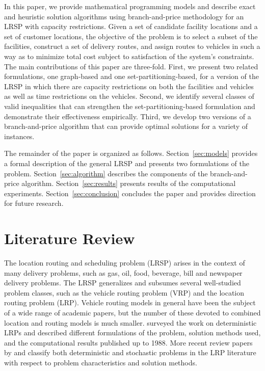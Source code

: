 \documentclass[11pt]{article}
\begin{document}
In this paper, we provide mathematical programming models and describe 
exact and heuristic solution algorithms using branch-and-price methodology for an LRSP with 
capacity restrictions. Given a set of candidate facility locations and a set of customer locations, 
the objective of the problem is to select a subset of the facilities, 
construct a set of delivery routes, and assign routes to vehicles 
in such a way as to minimize total cost subject to satisfaction of the system's constraints.   
The main contributions of this paper are three-fold.  First, we present
two related formulations, one graph-based and one set-partitioning-based, for a version of the LRSP
in which there are capacity restrictions on both the facilities and vehicles as well as time restrictions
on the vehicles.  Second, we identify several classes of valid inequalities that can
strengthen the set-partitioning-based formulation and demonstrate their effectiveness empirically.
Third, we develop two versions of a branch-and-price algorithm that can provide optimal solutions 
for a variety of instances.

The remainder of the paper is organized as follows. Section~\ref{sec:models} provides a formal description
of the general LRSP and presents two formulations of the problem. Section~\ref{sec:algorithm} 
describes the components of the branch-and-price algorithm. Section~\ref{sec:results} 
presents results of the computational experiments. Section~\ref{sec:conclusion} concludes 
the paper and provides direction for future research.
 
\section{Literature Review}
The location routing and scheduling problem (LRSP) arises in the context of many 
delivery problems, such as gas, oil, food, beverage, bill and newspaper delivery problems. 
The LRSP generalizes and subsumes several well-studied problem 
classes, such as the vehicle routing problem (VRP) and the location routing problem (LRP). 
Vehicle routing models in general have been the subject of a wide range of
academic papers, but the number of these devoted to combined location and
routing models is much smaller. \citet{Laporte} surveyed the work on
deterministic LRPs and described different formulations of the problem,
solution methods used, and the computational results published up to 1988.
More recent review papers by \citet{Min} and \citet{Nagy} classify both 
deterministic and stochastic problems in the LRP literature with respect to 
problem characteristics and solution methods. 
\end{document}
